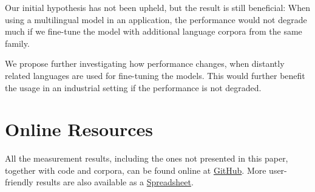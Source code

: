 \documentclass[sigconf]{acmart}
\begin{document}
Our initial hypothesis has not been upheld, but the result is still beneficial:
When using a multilingual model in an application, the performance would not degrade much if we fine-tune the model with additional language corpora from the same family.

We propose further investigating how performance changes, when distantly related languages are used for fine-tuning the models. 
This would further benefit the usage in an industrial setting if the performance is not degraded.







\appendix

\section{Online Resources}
\label{sec:online-resources}

All the measurement results, including the ones not presented in this paper, together with code and corpora, can be found online at
{\color{blue}\href{https://github.com/ivlcic/trans-ner}{GitHub}}.
More user-friendly results are also available as a
{\color{blue}\href{https://docs.google.com/spreadsheets/d/16UaPR-qneNN8mlzjNkjc9kdry2eQl4J84t3EfDOtBj0/edit?usp=sharing}{Spreadsheet}}.
\end{document}
